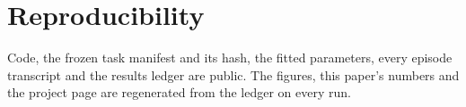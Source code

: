 \documentclass[11pt]{article}
\begin{document}
\section{Reproducibility}
Code, the frozen task manifest and its hash, the fitted parameters, every episode transcript and the results ledger are public.
The figures, this paper's numbers and the project page are regenerated from the ledger on every run.



\end{document}
